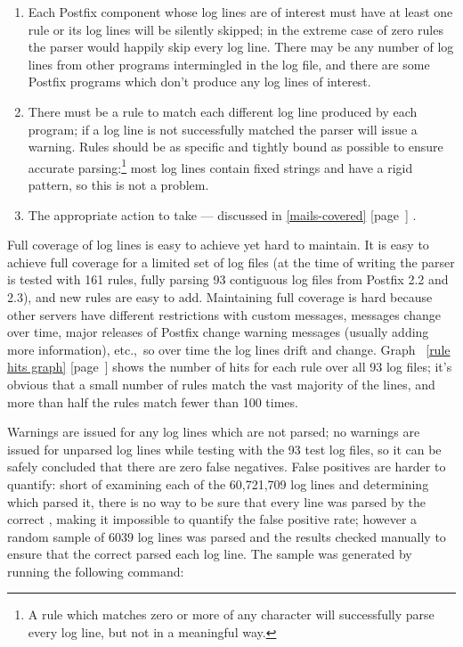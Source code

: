 \documentclass[a4paper,12pt,draft]{article}
\newcommand{\refwithpage}[1]{%
    \empty{}\ref{#1} [page~\pageref{#1}]%
}
\newcommand{\sectionref}[1]{%
    \textsection{}\refwithpage{#1}%
}
\newcommand{\numberOFlogFILES}[0]{%
    93%
}
\newcommand{\numberOFrules}[0]{%
    161%
}
\begin{document}
\begin{enumerate}

    \item Each Postfix component whose log lines are of interest must have
        at least one rule or its log lines will be silently skipped; in the
        extreme case of zero rules the parser would happily skip every log
        line.  There may be any number of log lines from other programs
        intermingled in the log file, and there are some Postfix programs
        which don't produce any log lines of interest.

    \item There must be a rule to match each different log line produced by
        each program; if a log line is not successfully matched the parser
        will issue a warning.  Rules should be as specific and tightly
        bound as possible to ensure accurate parsing:\footnote{A rule which
        matches zero or more of any character will successfully parse every
        log line, but not in a meaningful way.} most log lines contain
        fixed strings and have a rigid pattern, so this is not a problem.

    \item The appropriate action to take --- discussed in
        \sectionref{mails-covered}.

\end{enumerate}

Full coverage of log lines is easy to achieve yet hard to maintain.  It is
easy to achieve full coverage for a limited set of log files (at the time
of writing the parser is tested with \numberOFrules{} rules, fully parsing
\numberOFlogFILES{} contiguous log files from Postfix 2.2 and 2.3), and new
rules are easy to add.  Maintaining full coverage is hard because other
servers have different restrictions with custom messages, \RBL{} messages
change over time, major releases of Postfix change warning messages
(usually adding more information), etc.,\ so over time the log lines drift
and change.  Graph~\refwithpage{rule hits graph} shows the number of hits
for each rule over all \numberOFlogFILES{} log files; it's obvious that a
small number of rules match the vast majority of the lines, and more than
half the rules match fewer than 100 times.

Warnings are issued for any log lines which are not parsed; no warnings are
issued for unparsed log lines while testing with the \numberOFlogFILES{}
test log files, so it can be safely concluded that there are zero false
negatives.  False positives are harder to quantify: short of examining each
of the 60,721,709 log lines and determining which \regex{} parsed it, there
is no way to be sure that every line was parsed by the correct \regex{},
making it impossible to quantify the false positive rate; however a random
sample of 6039 log lines was parsed and the results checked manually to
ensure that the correct \regex{} parsed each log line.  The sample was
generated by running the following command:
\end{document}
